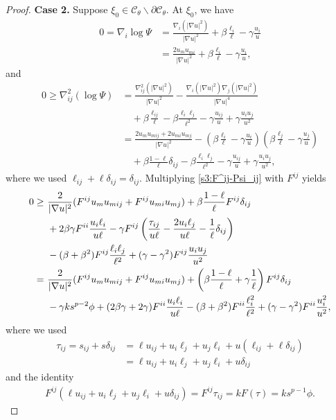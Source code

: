 \documentclass[12pt]{amsart}
\numberwithin{equation}{section}
\newcommand{\8}{\infty}
\newcommand{\de}{\delta}
\newcommand{\cC}{\mathcal{C}}
\newcommand{\del}{\partial}
\newcommand{\eq}[1]{\begin{equation}\begin{alignedat}{2}#1\end{alignedat}\end{equation}}
\begin{document}
\begin{proof}
{\bf Case 2.} Suppose $\xi_0\in \cC_\theta\backslash \del\cC_\theta$. At $\xi_0$, we have
\eq{\label{grad zero}
0=\nabla_i \log \Psi
&=\frac{\nabla_i(|\nabla u|^2)}{|\nabla u|^2}+\beta\frac{\ell_i}{\ell}-\gamma \frac{u_i}{u}\\
&=\frac{2u_m u_{mi}}{|\nabla u|^2}+\beta\frac{\ell_i}{\ell}-\gamma \frac{u_i}{u},
}
and
\eq{ \label{s3:F^ij-Psi_ij}
0\geq \nabla^2_{ij}(\log \Psi)
&=\frac{\nabla^2_{ij}(|\nabla u|^2)}{|\nabla u|^2}-\frac{\nabla_i (|\nabla u|^2)\nabla_j (|\nabla u|^2)}{|\nabla u|^4}\\
&\quad +\beta\frac{\ell_{ij}}{\ell}-\beta\frac{\ell_i\ell_j}{\ell^2}-\gamma \frac{u_{ij}}{u}+\gamma \frac{u_iu_j}{u^2}\\
&= \frac{2u_m u_{mij}+2u_{mi}u_{mj}}{|\nabla u|^2}-(\beta\frac{\ell_i}{\ell}-\gamma\frac{u_i}{u})(\beta\frac{\ell_j}{\ell}-\gamma\frac{u_j}{u})\\
&\quad +\beta\frac{1-\ell}{\ell}\de_{ij}-\beta\frac{\ell_i\ell_j}{\ell^2}-\gamma\frac{ u_{ij}}{u}+\gamma\frac{u_iu_j}{u^2},
}
where we used $\ell_{ij}+\ell \de_{ij}=\de_{ij}$.
Multiplying \eqref{s3:F^ij-Psi_ij} with $F^{ij}$ yields
\eq{ \label{s3:F^ij-u_m-u_{mij}}
0 \geq &~\frac{2}{|\nabla u|^2}(F^{ij}u_m u_{mij}+F^{ij}u_{mi}u_{mj})+\beta\frac{1-\ell}{\ell}F^{ij}\de_{ij}\\
&~+2\beta\gamma F^{ii}\frac{u_i \ell_i}{u\ell}-\gamma F^{ij}\left(\frac{\tau_{ij}}{u\ell}-\frac{2u_i\ell_j}{u \ell}-\frac{1}{\ell}\de_{ij}\right)\\
&~-(\beta+\beta^2)F^{ij}\frac{\ell_i\ell_j}{\ell^2}+(\gamma-\gamma^2)F^{ij}\frac{u_iu_j}{u^2} \\
= &~\frac{2}{|\nabla u|^2}(F^{ij}u_m u_{mij}+F^{ij}u_{mi}u_{mj})+\left(\beta\frac{1-\ell}{\ell}+\gamma\frac{1}{\ell}\right)F^{ij}\de_{ij}\\
&~-\gamma k s^{p-2}\phi+(2\beta\gamma+2\gamma) F^{ii}\frac{u_i \ell_i}{u\ell}-(\beta+\beta^2)F^{ii}\frac{\ell_i^2}{\ell^2}+(\gamma-\gamma^2)F^{ii}\frac{u_i^2}{u^2},
}
where we used
\eq{\label{tau-u}
\tau_{ij}=s_{ij}+s\de_{ij}
&=\ell u_{ij}+u_i \ell_j+u_j \ell_i+u(\ell_{ij}+\ell\de_{ij})\\
&=\ell u_{ij}+u_i \ell_j+u_j \ell_i+u\de_{ij}
}
and the identity
\eq{
F^{ij}(\ell u_{ij}+u_i \ell_j+u_j \ell_i+u\de_{ij})=F^{ij}\tau_{ij}=k F(\tau)= k s^{p-1} \phi.
}


\end{proof}
\end{document}
